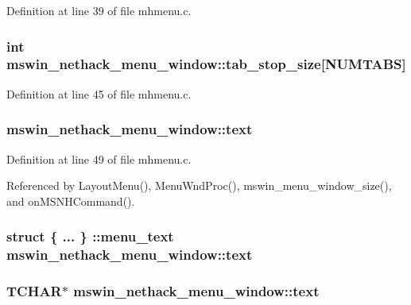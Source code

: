 Definition at line 39 of file mhmenu.\+c.

\hypertarget{structmswin__nethack__menu__window_ab8f612d29db613381b4982fc2f4d620a}{
\subsubsection[{tab\+\_\+stop\+\_\+size}]{\setlength{\rightskip}{0pt plus 5cm}int mswin\+\_\+nethack\+\_\+menu\+\_\+window\+::tab\+\_\+stop\+\_\+size\mbox{[}{\bf N\+U\+M\+T\+A\+B\+S}\mbox{]}}}\label{structmswin__nethack__menu__window_ab8f612d29db613381b4982fc2f4d620a}


Definition at line 45 of file mhmenu.\+c.

\hypertarget{structmswin__nethack__menu__window_ac6c6169f2aa8de6b303db695539d770a}{
\subsubsection[{text}]{ mswin\+\_\+nethack\+\_\+menu\+\_\+window\+::text}}\label{structmswin__nethack__menu__window_ac6c6169f2aa8de6b303db695539d770a}


Definition at line 49 of file mhmenu.\+c.



Referenced by Layout\+Menu(), Menu\+Wnd\+Proc(), mswin\+\_\+menu\+\_\+window\+\_\+size(), and on\+M\+S\+N\+H\+Command().

\hypertarget{structmswin__nethack__menu__window_a4b38bb96851eb566dd0859b3353d6257}{
\subsubsection[{text}]{\setlength{\rightskip}{0pt plus 5cm}struct \{ ... \} \+::menu\+\_\+text  mswin\+\_\+nethack\+\_\+menu\+\_\+window\+::text}}\label{structmswin__nethack__menu__window_a4b38bb96851eb566dd0859b3353d6257}
\hypertarget{structmswin__nethack__menu__window_ae7987f36cc514d0f64b4c5ccdc533717}{
\subsubsection[{text}]{\setlength{\rightskip}{0pt plus 5cm}T\+C\+H\+A\+R$\ast$ mswin\+\_\+nethack\+\_\+menu\+\_\+window\+::text}}\label{structmswin__nethack__menu__window_ae7987f36cc514d0f64b4c5ccdc533717}


